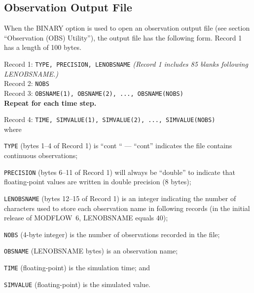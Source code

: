 \newpage
\subsection{Observation Output File}

When the BINARY option is used to open an observation output file (see section ``Observation (OBS) Utility''), the output file has the following form. Record 1 has a length of 100 bytes.

\vspace{5mm}
\noindent Record 1: \texttt{TYPE, PRECISION, LENOBSNAME} \textit{(Record 1 includes 85 blanks following LENOBSNAME.)} \\
\noindent Record 2: \texttt{NOBS} \\
\noindent Record 3: \texttt{OBSNAME(1),  OBSNAME(2), ..., OBSNAME(NOBS)} \\

\vspace{12pt}
\noindent \textbf{Repeat for each time step.}

\vspace{12pt}
\noindent Record 4: \texttt{TIME, SIMVALUE(1), SIMVALUE(2), ..., SIMVALUE(NOBS)} \\
 
\vspace{12pt}
\noindent where

\begin{description} \itemsep0pt \parskip0pt 
\item \texttt{TYPE} (bytes 1--4 of Record 1) is ``cont `` ---  ``cont'' indicates the file contains continuous observations;
\item \texttt{PRECISION} (bytes 6--11 of Record 1) will always be ``double'' to indicate that floating-point values are written in double precision (8 bytes);
\item \texttt{LENOBSNAME} (bytes 12--15 of Record 1) is an integer indicating the number of characters used to store each observation name in following records (in the initial release of MODFLOW~6, LENOBSNAME equals 40);
\item \texttt{NOBS} (4-byte integer) is the number of observations recorded in the file;
\item \texttt{OBSNAME} (LENOBSNAME bytes) is an observation name;
\item \texttt{TIME} (floating-point) is the simulation time; and
\item \texttt{SIMVALUE} (floating-point) is the simulated value.
\end{description}


